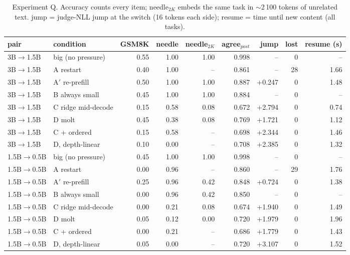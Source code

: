 \begin{table}[t]\centering\small\setlength{\tabcolsep}{4pt}\caption{Experiment Q. Accuracy counts every item; needle$_{2K}$ embeds the same task in $\sim$2\,100 tokens of unrelated text. jump = judge-NLL jump at the switch (16 tokens each side); resume = time until new content (all tasks).}\label{tab:quality}
\begin{tabular}{llrrrrrrr}\toprule
pair & condition & GSM8K & needle & needle$_{2K}$ & agree$_{post}$ & jump & lost & resume (s) \\\midrule
3B$\to$1.5B & big (no pressure) & 0.55 & 1.00 & 1.00 & 0.998 & -- & 0 & -- \\
3B$\to$1.5B & A restart & 0.40 & 1.00 & -- & 0.861 & -- & 28 & 1.66 \\
3B$\to$1.5B & A$'$ re-prefill & 0.50 & 1.00 & 1.00 & 0.887 & +0.247 & 0 & 1.48 \\
3B$\to$1.5B & B always small & 0.45 & 1.00 & 1.00 & 0.884 & -- & 0 & -- \\
3B$\to$1.5B & C ridge mid-decode & 0.15 & 0.58 & 0.08 & 0.672 & +2.794 & 0 & 0.74 \\
3B$\to$1.5B & D molt & 0.45 & 0.38 & 0.08 & 0.769 & +1.721 & 0 & 1.12 \\
3B$\to$1.5B & C + ordered & 0.15 & 0.58 & -- & 0.698 & +2.344 & 0 & 1.46 \\
3B$\to$1.5B & D, depth-linear & 0.10 & 0.00 & -- & 0.708 & +2.385 & 0 & 1.32 \\
1.5B$\to$0.5B & big (no pressure) & 0.45 & 1.00 & 1.00 & 0.998 & -- & 0 & -- \\
1.5B$\to$0.5B & A restart & 0.00 & 0.96 & -- & 0.860 & -- & 29 & 1.76 \\
1.5B$\to$0.5B & A$'$ re-prefill & 0.25 & 0.96 & 0.42 & 0.848 & +0.724 & 0 & 1.38 \\
1.5B$\to$0.5B & B always small & 0.00 & 0.96 & 0.42 & 0.850 & -- & 0 & -- \\
1.5B$\to$0.5B & C ridge mid-decode & 0.00 & 0.21 & 0.08 & 0.674 & +1.940 & 0 & 1.49 \\
1.5B$\to$0.5B & D molt & 0.05 & 0.12 & 0.00 & 0.720 & +1.979 & 0 & 1.96 \\
1.5B$\to$0.5B & C + ordered & 0.00 & 0.21 & -- & 0.686 & +1.779 & 0 & 1.43 \\
1.5B$\to$0.5B & D, depth-linear & 0.05 & 0.00 & -- & 0.720 & +3.107 & 0 & 1.52 \\
\bottomrule\end{tabular}\end{table}

